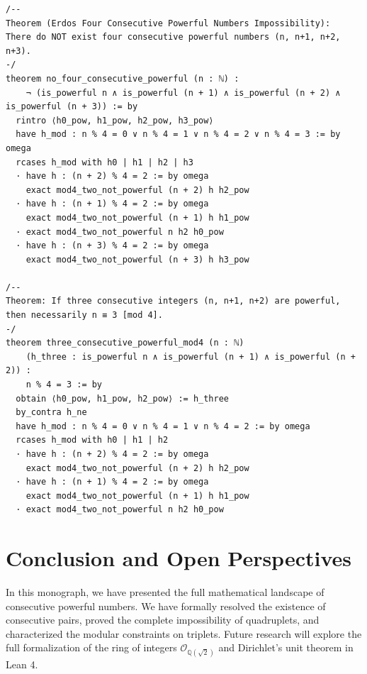 \documentclass[11pt,a4paper]{article}
\theoremstyle{definition}
\begin{document}
\begin{lstlisting}[caption={Formal Lean 4 Implementation of Consecutive Powerful Numbers}]
/--
Theorem (Erdos Four Consecutive Powerful Numbers Impossibility):
There do NOT exist four consecutive powerful numbers (n, n+1, n+2, n+3).
-/
theorem no_four_consecutive_powerful (n : ℕ) :
    ¬ (is_powerful n ∧ is_powerful (n + 1) ∧ is_powerful (n + 2) ∧ is_powerful (n + 3)) := by
  rintro ⟨h0_pow, h1_pow, h2_pow, h3_pow⟩
  have h_mod : n % 4 = 0 ∨ n % 4 = 1 ∨ n % 4 = 2 ∨ n % 4 = 3 := by omega
  rcases h_mod with h0 | h1 | h2 | h3
  · have h : (n + 2) % 4 = 2 := by omega
    exact mod4_two_not_powerful (n + 2) h h2_pow
  · have h : (n + 1) % 4 = 2 := by omega
    exact mod4_two_not_powerful (n + 1) h h1_pow
  · exact mod4_two_not_powerful n h2 h0_pow
  · have h : (n + 3) % 4 = 2 := by omega
    exact mod4_two_not_powerful (n + 3) h h3_pow

/--
Theorem: If three consecutive integers (n, n+1, n+2) are powerful, then necessarily n ≡ 3 [mod 4].
-/
theorem three_consecutive_powerful_mod4 (n : ℕ)
    (h_three : is_powerful n ∧ is_powerful (n + 1) ∧ is_powerful (n + 2)) :
    n % 4 = 3 := by
  obtain ⟨h0_pow, h1_pow, h2_pow⟩ := h_three
  by_contra h_ne
  have h_mod : n % 4 = 0 ∨ n % 4 = 1 ∨ n % 4 = 2 := by omega
  rcases h_mod with h0 | h1 | h2
  · have h : (n + 2) % 4 = 2 := by omega
    exact mod4_two_not_powerful (n + 2) h h2_pow
  · have h : (n + 1) % 4 = 2 := by omega
    exact mod4_two_not_powerful (n + 1) h h1_pow
  · exact mod4_two_not_powerful n h2 h0_pow
\end{lstlisting}

\section{Conclusion and Open Perspectives}
In this monograph, we have presented the full mathematical landscape of consecutive powerful numbers. We have formally resolved the existence of consecutive pairs, proved the complete impossibility of quadruplets, and characterized the modular constraints on triplets. Future research will explore the full formalization of the ring of integers $\mathcal{O}_{\mathbb{Q}(\sqrt{2})}$ and Dirichlet's unit theorem in Lean 4.
\end{document}

